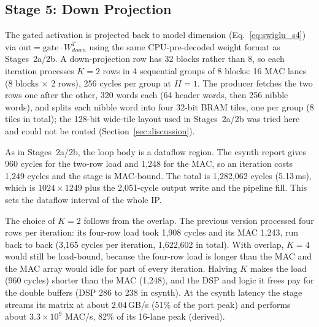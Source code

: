 \subsection{Stage 5: Down Projection}
\label{subsec:stage5}
The gated activation is projected back to model dimension (Eq.~\eqref{eq:swiglu_s4}) via
$\text{out} = \text{gate} \cdot W_{down}^{T}$ using the same CPU-pre-decoded weight
format as Stages~2a/2b. A down-projection row has 32 blocks rather than 8, so each
iteration processes $K=2$ rows in 4 sequential groups of 8 blocks: 16 MAC lanes
(8 blocks $\times$ 2 rows), 256 cycles per group at $II=1$. The producer fetches the two
rows one after the other, 320 words each (64 header words, then 256 nibble words), and splits each nibble word into four 32-bit
BRAM tiles, one per group (8 tiles in total); the 128-bit wide-tile layout used in
Stages~2a/2b was tried here and could not be routed (Section~\ref{sec:discussion}).

As in Stages~2a/2b, the loop body is a dataflow region. The csynth report gives 960
cycles for the two-row load and 1,248 for the MAC, so an iteration costs 1,249 cycles
and the stage is MAC-bound. The total is 1,282,062 cycles (5.13\,ms), which is
$1024\times1249$ plus the 2,051-cycle output write and the pipeline fill. This sets the
dataflow interval of the whole IP.

The choice of $K=2$ follows from the overlap. The previous version processed four rows
per iteration: its four-row load took 1,908 cycles and its MAC 1,243, run back to back
(3,165 cycles per iteration, 1,622,602 in total). With overlap, $K=4$ would still be
load-bound, because the four-row load is longer than the MAC and the MAC array would
idle for part of every iteration. Halving $K$ makes the load (960 cycles) shorter than
the MAC (1,248), and the DSP and logic it frees pay for the double buffers (DSP 286 to
238 in csynth). At the csynth latency the stage streams its matrix at about 2.04\,GB/s
(51\% of the port peak) and performs about $3.3\times10^{9}$ MAC/s, 82\% of its 16-lane
peak (derived).
